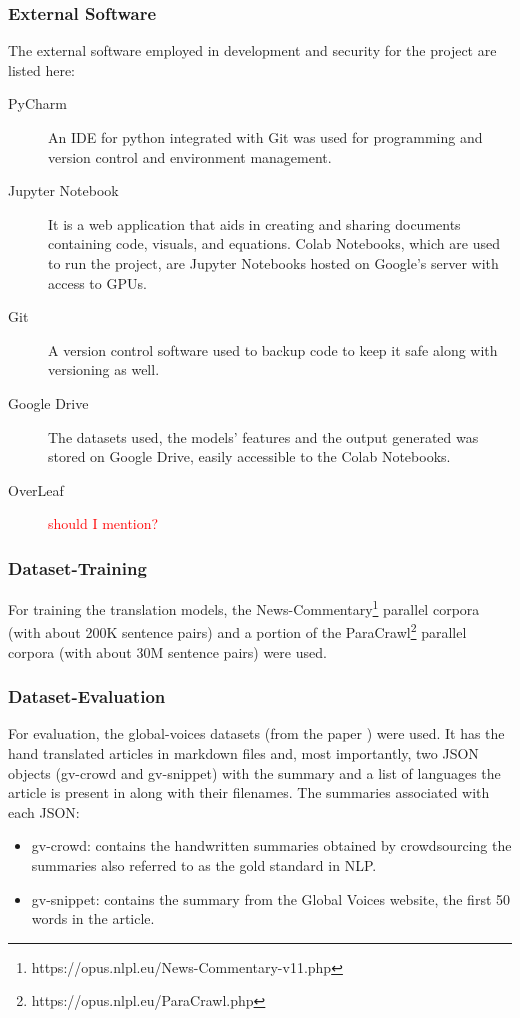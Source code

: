\documentclass[12pt,a4paper,twoside,openright]{report}
\newcommand{\red}[1]{\textcolor{red}{#1}}
\begin{document}
\subsubsection{External Software}
The external software employed in development and security for the project are listed here:
\begin{description}
\item[PyCharm]
An IDE for python integrated with Git was used for programming and version control and environment management. 

\item[Jupyter Notebook]
It is a web application that aids in creating and sharing documents containing code, visuals, and equations. Colab Notebooks, which are used to run the project, are Jupyter Notebooks hosted on Google's server with access to GPUs. 

\item[Git]
A version control software used to backup code to keep it safe along with versioning as well. 

\item[Google Drive]
The datasets used, the models' features and the output generated was stored on Google Drive, easily accessible to the Colab Notebooks. 

\item[OverLeaf]
\red{should I mention?}

\end{description}


\subsubsection{Dataset-Training}
For training the translation models, the News-Commentary\footnote{https://opus.nlpl.eu/News-Commentary-v11.php} parallel corpora (with about 200K sentence pairs) and a portion of the ParaCrawl\footnote{https://opus.nlpl.eu/ParaCrawl.php} parallel corpora (with about 30M sentence pairs) were used. 

\subsubsection{Dataset-Evaluation}
For evaluation, the global-voices datasets (from the paper \cite{nguyen-daume-iii-2019-global}) were used. It has the hand translated articles in markdown files and, most importantly, two JSON objects (gv-crowd and gv-snippet) with the summary and a list of languages the article is present in along with their filenames. The summaries associated with each JSON: \begin{itemize}
    \item gv-crowd: contains the handwritten summaries obtained by crowdsourcing the summaries also referred to as the gold standard in NLP. 
    \item gv-snippet: contains the summary from the Global Voices website, the first 50 words in the article.
\end{itemize}
\end{document}
